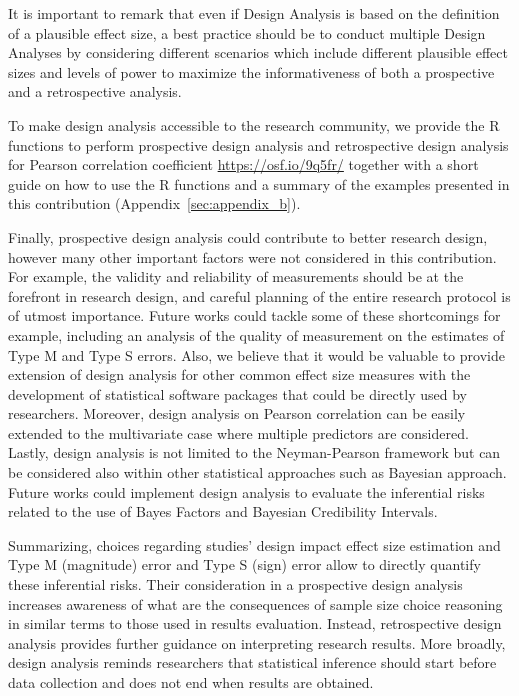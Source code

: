 \documentclass{article}\usepackage[]{graphicx}\usepackage[]{color}
\begin{document}
It is important to remark that even if Design Analysis is based on the definition of a plausible effect size, a best practice should be to conduct multiple Design Analyses by considering different scenarios which  include different plausible effect sizes and levels of power to maximize the informativeness of both a prospective and a retrospective analysis.

To make design analysis accessible to the research community, we provide the R functions to perform prospective design analysis and retrospective design analysis for Pearson correlation coefficient \url{https://osf.io/9q5fr/} together with a short guide on how to use the R functions and a summary of the examples presented in this contribution (Appendix~\ref{sec:appendix_b}).

Finally, prospective design analysis could contribute to better research design, however many other important factors were not considered in this contribution. For example, the validity and reliability of measurements should be at the forefront in research design, and careful planning of the entire research protocol is of utmost importance. Future works could tackle some of these shortcomings for example, including an analysis of the quality of measurement on the estimates of Type M and Type S errors. Also, we believe that it would be valuable to provide extension of design analysis for other common effect size measures with the development of statistical software packages that could be directly used by researchers. Moreover, design analysis on Pearson correlation can be easily extended to the multivariate case where multiple predictors are considered. Lastly, design analysis is not limited to the Neyman-Pearson framework but can be considered also within other statistical approaches such as Bayesian approach. Future works could implement design analysis to evaluate the inferential risks related to the use of Bayes Factors and Bayesian Credibility Intervals.

Summarizing, choices regarding studies’ design impact effect size estimation and Type M (magnitude) error and Type S (sign) error allow to directly quantify these inferential risks. Their consideration in a prospective design analysis increases awareness of what are the consequences of sample size choice reasoning in similar terms to those used in results evaluation. Instead, retrospective design analysis provides further guidance on interpreting research results. More broadly, design analysis reminds researchers that statistical inference should start before data collection and does not end when results are obtained.
\end{document}
